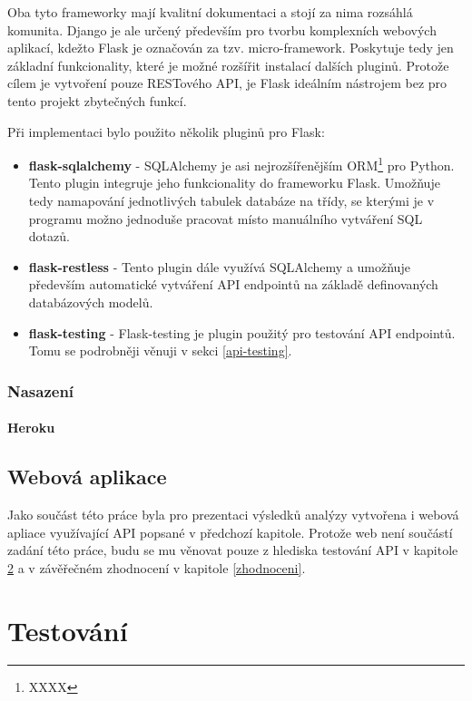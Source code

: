 \documentclass[thesis=B,czech]{FITthesis}[2012/06/26]
\begin{document}
	Oba tyto frameworky mají kvalitní dokumentaci a stojí za nima rozsáhlá komunita. Django je ale určený především pro tvorbu komplexních webových aplikací, kdežto Flask je označován za tzv. micro-framework. Poskytuje tedy jen základní funkcionality, které je možné rozšířit instalací dalších pluginů. Protože cílem je vytvoření pouze RESTového API, je Flask ideálním nástrojem bez pro tento projekt zbytečných funkcí. 
	
\noindent Při implementaci bylo použito několik pluginů pro Flask:
	
\begin{itemize}
\item \textbf{flask-sqlalchemy} - SQLAlchemy je asi nejrozšířenějším ORM\footnote{XXXX} pro Python. Tento plugin integruje jeho funkcionality do frameworku Flask. Umožňuje tedy namapování jednotlivých tabulek databáze na třídy, se kterými je v programu možno jednoduše pracovat místo manuálního vytváření SQL dotazů. 
\item \textbf{flask-restless} - Tento plugin dále využívá SQLAlchemy a umožňuje především automatické vytváření API endpointů na základě definovaných databázových modelů. 
\item \textbf{flask-testing} - Flask-testing je plugin použitý pro testování API endpointů. Tomu se podrobněji věnuji v sekci \ref{api-testing}.
\end{itemize}

\subsection{Nasazení}
\subsubsection{Heroku}


\section{Webová aplikace}
	Jako součást této práce byla pro prezentaci výsledků analýzy vytvořena i webová apliace využívající API popsané v předchozí kapitole. Protože web není součástí zadání této práce, budu se mu věnovat pouze z hlediska testování API v kapitole \ref{testovani} a v závěřečném zhodnocení v kapitole \ref{zhodnoceni}. 


\chapter{Testování}
\label{testovani}
\end{document}
